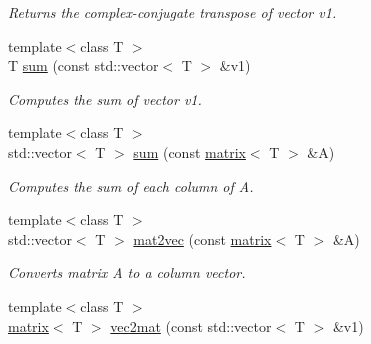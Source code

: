 \begin{DoxyCompactItemize}
\begin{DoxyCompactList}\small\item\em Returns the complex-\/conjugate transpose of vector v1. \end{DoxyCompactList}\item 
\hypertarget{namespacekeycpp_a053c56f068ffe8c4a32e5a820b424b6e}{{\footnotesize template$<$class T $>$ }\\T \hyperlink{namespacekeycpp_a053c56f068ffe8c4a32e5a820b424b6e}{sum} (const std\-::vector$<$ T $>$ \&v1)}\label{namespacekeycpp_a053c56f068ffe8c4a32e5a820b424b6e}

\begin{DoxyCompactList}\small\item\em Computes the sum of vector v1. \end{DoxyCompactList}\item 
\hypertarget{namespacekeycpp_a778b050929a9f5cea9136df5d8bfe2d8}{{\footnotesize template$<$class T $>$ }\\std\-::vector$<$ T $>$ \hyperlink{namespacekeycpp_a778b050929a9f5cea9136df5d8bfe2d8}{sum} (const \hyperlink{classkeycpp_1_1matrix}{matrix}$<$ T $>$ \&A)}\label{namespacekeycpp_a778b050929a9f5cea9136df5d8bfe2d8}

\begin{DoxyCompactList}\small\item\em Computes the sum of each column of A. \end{DoxyCompactList}\item 
\hypertarget{namespacekeycpp_a966268670bc3e3b4f7107b8278e9b399}{{\footnotesize template$<$class T $>$ }\\std\-::vector$<$ T $>$ \hyperlink{namespacekeycpp_a966268670bc3e3b4f7107b8278e9b399}{mat2vec} (const \hyperlink{classkeycpp_1_1matrix}{matrix}$<$ T $>$ \&A)}\label{namespacekeycpp_a966268670bc3e3b4f7107b8278e9b399}

\begin{DoxyCompactList}\small\item\em Converts matrix A to a column vector. \end{DoxyCompactList}\item 
\hypertarget{namespacekeycpp_a4876140bc1dc01b4488c1bb2bba08940}{{\footnotesize template$<$class T $>$ }\\\hyperlink{classkeycpp_1_1matrix}{matrix}$<$ T $>$ \hyperlink{namespacekeycpp_a4876140bc1dc01b4488c1bb2bba08940}{vec2mat} (const std\-::vector$<$ T $>$ \&v1)}\label{namespacekeycpp_a4876140bc1dc01b4488c1bb2bba08940}


\end{DoxyCompactItemize}
